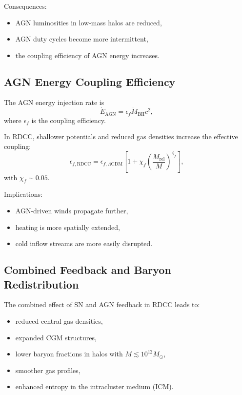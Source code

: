 \documentclass[11pt,a4paper]{article}
\begin{document}
Consequences:
\begin{itemize}
\item AGN luminosities in low-mass halos are reduced,
\item AGN duty cycles become more intermittent,
\item the coupling efficiency of AGN energy increases.
\end{itemize}

\subsection{AGN Energy Coupling Efficiency}

The AGN energy injection rate is
\begin{equation}
\dot{E}_{\mathrm{AGN}}
=
\epsilon_{f}
\dot{M}_{\mathrm{BH}} c^{2},
\end{equation}
where $\epsilon_{f}$ is the coupling efficiency.

In RDCC, shallower potentials and reduced gas densities increase the effective coupling:
\begin{equation}
\epsilon_{f,\mathrm{RDCC}}
=
\epsilon_{f,\Lambda\mathrm{CDM}}
\left[
1
+
\chi_{f}
\left(
\frac{M_{\mathrm{rel}}}{M}
\right)^{\beta_{f}}
\right],
\end{equation}
with $\chi_{f} \sim 0.05$.

Implications:
\begin{itemize}
\item AGN-driven winds propagate further,
\item heating is more spatially extended,
\item cold inflow streams are more easily disrupted.
\end{itemize}

\subsection{Combined Feedback and Baryon Redistribution}

The combined effect of SN and AGN feedback in RDCC leads to:
\begin{itemize}
\item reduced central gas densities,
\item expanded CGM structures,
\item lower baryon fractions in halos with $M \lesssim 10^{12} M_{\odot}$,
\item smoother gas profiles,
\item enhanced entropy in the intracluster medium (ICM).
\end{itemize}
\end{document}
